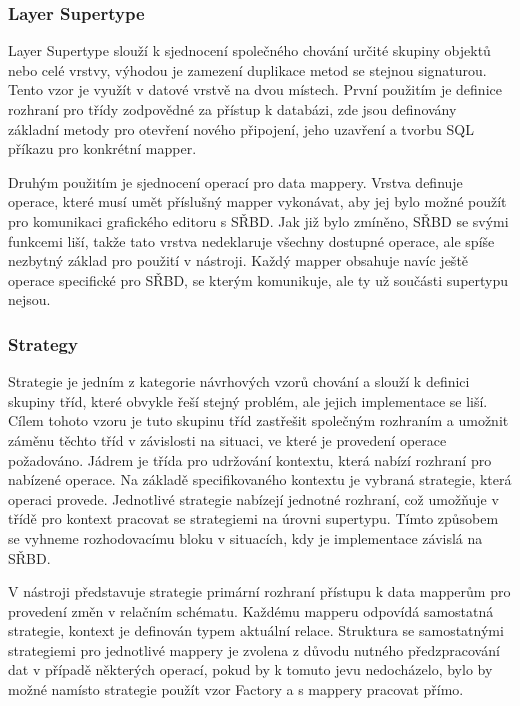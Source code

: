 \documentclass[czech,bachelor,public,dept460,male,oneside]{diploma}
\begin{document}
		\subsubsection{Layer Supertype}
		Layer Supertype slouží k sjednocení společného chování určité skupiny objektů nebo celé vrstvy, výhodou je zamezení duplikace metod se stejnou signaturou. Tento vzor je využít v datové vrstvě na dvou místech. První použitím je definice rozhraní pro třídy zodpovědné za přístup k databázi, zde jsou definovány základní metody pro otevření nového připojení, jeho uzavření a tvorbu SQL příkazu pro konkrétní mapper. 
		
		Druhým použitím je sjednocení operací pro data mappery. Vrstva definuje operace, které musí umět příslušný mapper vykonávat, aby jej bylo možné použít pro komunikaci grafického editoru s SŘBD. Jak již bylo zmíněno, SŘBD se svými funkcemi liší, takže tato vrstva nedeklaruje všechny dostupné operace, ale spíše nezbytný základ pro použití v nástroji. Každý mapper obsahuje navíc ještě operace specifické pro SŘBD, se kterým komunikuje, ale ty už součásti supertypu nejsou.
	
		\subsubsection{Strategy} \label{secStrategy}
		Strategie je jedním z kategorie návrhových vzorů chování a slouží k definici skupiny tříd, které obvykle řeší stejný problém, ale jejich implementace se liší. Cílem tohoto vzoru je tuto skupinu tříd zastřešit společným rozhraním a umožnit záměnu těchto tříd v závislosti na situaci, ve které je provedení operace požadováno. Jádrem je třída pro udržování kontextu, která nabízí rozhraní pro nabízené operace. Na základě specifikovaného kontextu je vybraná strategie, která operaci provede. Jednotlivé strategie nabízejí jednotné rozhraní, což umožňuje v třídě pro kontext pracovat se strategiemi na úrovni supertypu. Tímto způsobem se vyhneme rozhodovacímu bloku v situacích, kdy je implementace závislá na SŘBD.
		
		V nástroji představuje strategie primární rozhraní přístupu k data mapperům pro provedení změn v relačním schématu. Každému mapperu odpovídá samostatná strategie, kontext je definován typem aktuální relace. Struktura se samostatnými strategiemi pro jednotlivé mappery je zvolena z důvodu nutného předzpracování dat v případě některých operací, pokud by k tomuto jevu nedocházelo, bylo by možné namísto strategie použít vzor Factory a s mappery pracovat přímo. 
		
\end{document}
